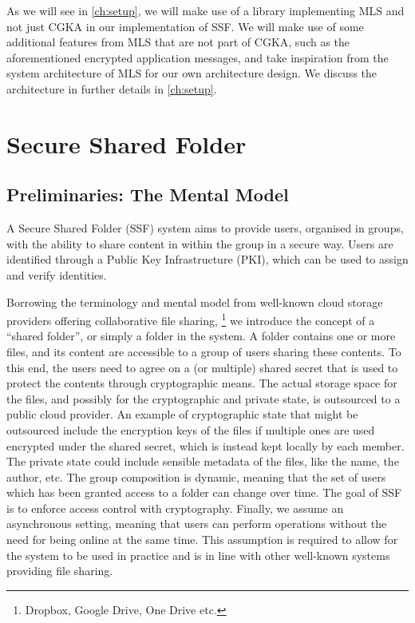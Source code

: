 As we will see in \cref{ch:setup}, we will make use of a library implementing MLS and not just CGKA in our implementation of SSF.
We will make use of some additional features from MLS that are not part of CGKA, such as the
aforementioned encrypted application messages,
and take inspiration from the system architecture of MLS for our own architecture design.
We discuss the architecture in further details in \cref{ch:setup}.

\section{Secure Shared Folder}\label{sc:SSF}

\subsection{Preliminaries: The Mental Model}\label{sc:mental-model}

A Secure Shared Folder (SSF) system aims to provide users, organised in groups, 
with the ability to share content in within the group in a secure way.
Users are identified through a Public Key Infrastructure (PKI),
which can be used to assign and verify identities.

Borrowing the terminology and mental model from well-known cloud storage providers offering collaborative file sharing, 
\footnote{Dropbox, Google Drive, One Drive etc.}
we introduce the concept of a ``shared folder'', or simply a folder in the system.
A folder contains one or more files, and its content are accessible to a group of users sharing these contents.
To this end, the users need to agree on a (or multiple) shared secret that is used to protect the contents through cryptographic means.
The actual storage space for the files, and possibly for the cryptographic and private state, is outsourced to a public cloud provider.
An example of cryptographic state that might be outsourced include the encryption keys of the files if multiple ones are used encrypted under the
shared secret, which is instead kept locally by each member. The private state could include sensible metadata of the files,
like the name, the author, etc.
The group composition is dynamic, meaning that the set of users which has been granted access to a folder can change over time.
The goal of SSF is to enforce access control with cryptography.
Finally, we assume an asynchronous setting, meaning that users can
perform operations without the need for being online at the same time.
This assumption is required to allow for the system to be used in practice
and is in line with other well-known systems providing file sharing.

